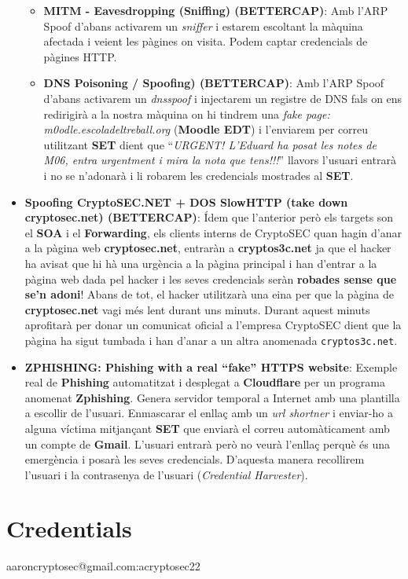 \documentclass[]{article}
\begin{document}
\begin{itemize}
  \begin{itemize}
  \item
    \textbf{MITM - Eavesdropping (Sniffing) (BETTERCAP)}: Amb l'ARP
    Spoof d'abans activarem un \emph{sniffer} i estarem escoltant la
    màquina afectada i veient les pàgines on visita. Podem captar
    credencials de pàgines HTTP.
  \item
    \textbf{DNS Poisoning / Spoofing) (BETTERCAP)}: Amb l'ARP Spoof
    d'abans activarem un \emph{dnsspoof} i injectarem un registre de DNS
    fals on ens redirigirà a la nostra màquina on hi tindrem una
    \emph{fake page: m0odle.escoladeltreball.org} (\textbf{Moodle EDT})
    i l'enviarem per correu utilitzant \textbf{SET} dient que
    ``\emph{URGENT! L'Eduard ha posat les notes de M06, entra urgentment
    i mira la nota que tens!!!}'' llavors l'usuari entrarà i no se
    n'adonarà i li robarem les credencials mostrades al \textbf{SET}.
  \end{itemize}
\item
  \textbf{Spoofing CryptoSEC.NET + DOS SlowHTTP (take down
  cryptosec.net) (BETTERCAP)}: Ídem que l'anterior però els targets son
  el \textbf{SOA} i el \textbf{Forwarding}, els clients interns de
  CryptoSEC quan hagin d'anar a la pàgina web \textbf{cryptosec.net},
  entraràn a \textbf{cryptos3c.net} ja que el hacker ha avisat que hi hà
  una urgència a la pàgina principal i han d'entrar a la pàgina web dada
  pel hacker i les seves credencials seràn \textbf{robades sense que
  se'n adoni}! Abans de tot, el hacker utilitzarà una eina per que la
  pàgina de \textbf{cryptosec.net} vagi més lent durant uns minuts.
  Durant aquest minuts aprofitarà per donar un comunicat oficial a
  l'empresa CryptoSEC dient que la pàgina ha sigut tumbada i han d'anar
  a un altra anomenada \texttt{cryptos3c.net}.
\item
  \textbf{ZPHISHING: Phishing with a real ``fake'' HTTPS website}:
  Exemple real de \textbf{Phishing} automatitzat i desplegat a
  \textbf{Cloudflare} per un programa anomenat \textbf{Zphishing}.
  Genera servidor temporal a Internet amb una plantilla a escollir de
  l'usuari. Enmascarar el enllaç amb un \emph{url shortner} i enviar-ho
  a alguna víctima mitjançant \textbf{SET} que enviarà el correu
  automàticament amb un compte de \textbf{Gmail}. L'usuari entrarà però
  no veurà l'enllaç perquè és una emergència i posarà les seves
  credencials. D'aquesta manera recollirem l'usuari i la contrasenya de
  l'usuari (\emph{Credential Harvester}).
\end{itemize}

\hypertarget{credentials}{%
\section{\texorpdfstring{\textbf{Credentials}}{Credentials}}\label{credentials}}

aaroncryptosec@gmail.com:acryptosec22
\end{document}
